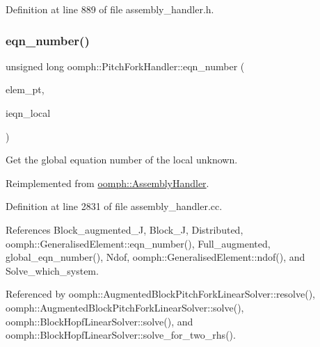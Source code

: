 Definition at line 889 of file assembly\+\_\+handler.\+h.

\mbox{\label{classoomph_1_1PitchForkHandler_ab29e58e25bd5bebd836e30015f01ac8d}} 
\subsubsection{\texorpdfstring{eqn\+\_\+number()}{eqn\_number()}}
{\footnotesize\ttfamily unsigned long oomph\+::\+Pitch\+Fork\+Handler\+::eqn\+\_\+number (\begin{DoxyParamCaption}\item[{\hyperlink{classoomph_1_1GeneralisedElement}{Generalised\+Element} $\ast$const \&}]{elem\+\_\+pt,  }\item[{const unsigned \&}]{ieqn\+\_\+local }\end{DoxyParamCaption})\hspace{0.3cm}{\ttfamily [virtual]}}



Get the global equation number of the local unknown. 



Reimplemented from \hyperlink{classoomph_1_1AssemblyHandler_a94d28e2de2559cde803d1ba2195b5290}{oomph\+::\+Assembly\+Handler}.



Definition at line 2831 of file assembly\+\_\+handler.\+cc.



References Block\+\_\+augmented\+\_\+J, Block\+\_\+J, Distributed, oomph\+::\+Generalised\+Element\+::eqn\+\_\+number(), Full\+\_\+augmented, global\+\_\+eqn\+\_\+number(), Ndof, oomph\+::\+Generalised\+Element\+::ndof(), and Solve\+\_\+which\+\_\+system.



Referenced by oomph\+::\+Augmented\+Block\+Pitch\+Fork\+Linear\+Solver\+::resolve(), oomph\+::\+Augmented\+Block\+Pitch\+Fork\+Linear\+Solver\+::solve(), oomph\+::\+Block\+Hopf\+Linear\+Solver\+::solve(), and oomph\+::\+Block\+Hopf\+Linear\+Solver\+::solve\+\_\+for\+\_\+two\+\_\+rhs().

\mbox{\label{classoomph_1_1PitchForkHandler_aa16d6770f6d46b7db4101f417373b191}} 

